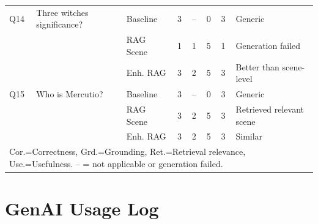 \documentclass[10pt,conference]{IEEEtran}
\begin{document}
\begin{table}[p]
\begin{tabularx}{\textwidth}{p{0.6cm} p{4cm} p{2.2cm} p{1cm} p{1cm} p{1cm} p{1cm} X}
\midrule
Q14 & Three witches significance? & Baseline & 3 & -- & 0 & 3 & Generic \\
    &                             & RAG Scene & 1 & 1 & 5 & 1 & Generation failed \\
    &                             & Enh. RAG  & 3 & 2 & 5 & 3 & Better than scene-level \\
\midrule
Q15 & Who is Mercutio? & Baseline & 3 & -- & 0 & 3 & Generic \\
    &                  & RAG Scene & 3 & 2 & 5 & 3 & Retrieved relevant scene \\
    &                  & Enh. RAG  & 3 & 2 & 5 & 3 & Similar \\
\bottomrule
\multicolumn{8}{l}{\footnotesize Cor.=Correctness, Grd.=Grounding, Ret.=Retrieval relevance,
Use.=Usefulness. -- = not applicable or generation failed.}
\end{tabularx}
\end{table}

\section{GenAI Usage Log}
\label{app:genai-log-varshu}
\end{document}
